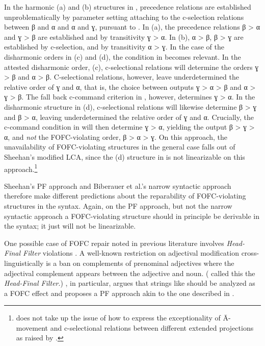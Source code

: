 \documentclass[output=paper]{langscibook}
\begin{document}
In the harmonic (a) and (b) structures in , precedence relations are established unproblematically by parameter setting attaching to the c-selection relations between β and α and α and ɣ, pursuant to . In (a), the precedence relations {β > α and  ɣ > β} are established and by transitivity ɣ > α. In (b), {α > β, β > ɣ} are established by c-selection, and by transitivity α > ɣ. In the case of the disharmonic orders in (c) and (d), the condition in  becomes relevant.  In the attested disharmonic order, (c), c-selectional relations will determine the orders ɣ > β and α > β.  C-selectional relations, however, leave underdetermined the relative order of ɣ and α, that is, the choice between outputs ɣ > α > β and α > ɣ > β.  The fall back c-command criterion in , however, determines ɣ > α. In the disharmonic structure in (d), c-selectional relations will likewise determine β > ɣ and β > α, leaving underdetermined the relative order of ɣ and α.  Crucially, the c-command condition in  will then determine ɣ > α, yielding the output β > ɣ > α, and \textit{not} the FOFC-violating order, β > α > ɣ.  On this approach, the unavailability of FOFC-violating structures in the general case falls out of Sheehan's modified LCA, since the (d) structure in  is not linearizable on this approach.\footnote{\citet{sheehan2013some} does not take up the issue of how to express the exceptionality of Ā-movement and c-selectional relations between different extended projections as raised by \cite{biberaueretal2014}.}

Sheehan's PF approach and Biberauer et al.'s narrow syntactic approach therefore make different predictions about the reparability of FOFC-violating structures in the syntax.  Again, on the PF approach, but not the narrow syntactic approach a FOFC-violating structure should in principle be derivable in the syntax; it just will not be linearizable.  
 
One possible case of FOFC repair noted in previous literature involves \textit{Head-Final Filter} violations \citep{greenberg1963, williams1982, sheehan2012fofchff}.  A well-known restriction on adjectival modification cross-linguistically is a ban on complements of prenominal adjectives where the adjectival complement appears between the adjective and noun. (\citealt{williams1982} called this the \textit{Head-Final Filter}.)  \citet{sheehan2012fofchff}, in particular, argues that strings like  should be analyzed as a FOFC effect and proposes a PF approach akin to the one described in .
\end{document}
